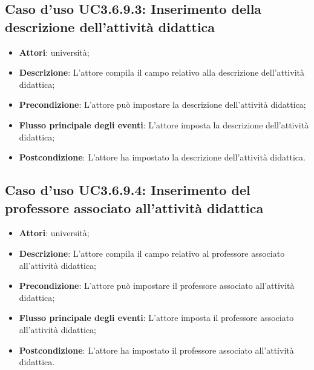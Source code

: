 \subsection{Caso d'uso \texorpdfstring{UC3.6.9.3}{UC3.6.9.3}: Inserimento della descrizione dell’attività didattica}
\begin{itemize}
\item \textbf{Attori}: università;
\item \textbf{Descrizione}: L'attore compila il campo relativo alla descrizione dell'attività didattica;

\item \textbf{Precondizione}: L'attore può impostare la descrizione dell'attività didattica;

\item \textbf{Flusso principale degli eventi}: L'attore imposta la descrizione dell'attività didattica;

\item \textbf{Postcondizione}: L'attore ha impostato la descrizione dell'attività didattica.

\end{itemize}
\subsection{Caso d'uso \texorpdfstring{UC3.6.9.4}{UC3.6.9.4}: Inserimento del professore associato all’attività didattica}
\begin{itemize}
\item \textbf{Attori}: università;
\item \textbf{Descrizione}: L'attore compila il campo relativo al professore associato all'attività didattica;

\item \textbf{Precondizione}: L'attore può impostare il professore associato all'attività didattica;

\item \textbf{Flusso principale degli eventi}: L'attore imposta il professore associato all'attività didattica;

\item \textbf{Postcondizione}: L'attore ha impostato il professore associato all'attività didattica.

\end{itemize}
